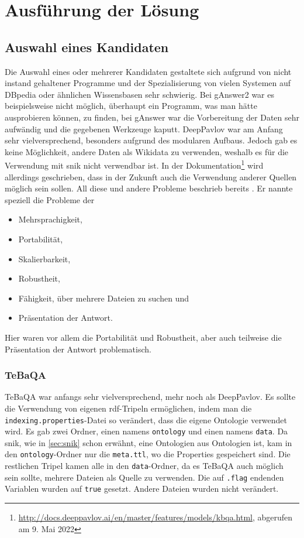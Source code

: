 \chapter{Ausführung der Lösung}\label{ch:solution}

\section{Auswahl eines Kandidaten}

Die Auswahl eines oder mehrerer Kandidaten gestaltete sich aufgrund von nicht instand gehaltener Programme
und der Spezialisierung von vielen Systemen auf DBpedia oder ähnlichen Wissensbasen sehr schwierig.
Bei gAnswer2 war es beispielsweise nicht möglich, überhaupt ein Programm, was man hätte ausprobieren können, zu finden,
bei gAnswer war die Vorbereitung der Daten sehr aufwändig und die gegebenen Werkzeuge kaputt.
DeepPavlov war am Anfang sehr vielversprechend, besonders aufgrund des modularen Aufbaus.
Jedoch gab es keine Möglichkeit, andere Daten als Wikidata zu verwenden, weshalb es für die Verwendung mit \ac{snik} nicht verwendbar ist.
In der Dokumentation\footnote{\url{http://docs.deeppavlov.ai/en/master/features/models/kbqa.html}, abgerufen am 9. Mai 2022} wird allerdings geschrieben,
dass in der Zukunft auch die Verwendung anderer Quellen möglich sein sollen.
All diese und andere Probleme beschrieb bereits \citet{diefenbachkbqa}.
Er nannte speziell die Probleme der
\begin{itemize}
  \item Mehrsprachigkeit,
  \item Portabilität,
  \item Skalierbarkeit,
  \item Robustheit,
  \item Fähigkeit, über mehrere Dateien zu suchen und
  \item Präsentation der Antwort.
\end{itemize}
Hier waren vor allem die Portabilität und Robustheit, aber auch teilweise die Präsentation der Antwort problematisch.

\subsection{TeBaQA}

TeBaQA war anfangs sehr vielversprechend, mehr noch als DeepPavlov.
Es sollte die Verwendung von eigenen \ac{rdf}-Tripeln ermöglichen, indem man die \texttt{indexing.properties}-Datei so verändert, dass die eigene Ontologie verwendet wird.
Es gab zwei Ordner, einen namens \texttt{ontology} und einen namens \texttt{data}.
Da \ac{snik}, wie in \cref{sec:snik} schon erwähnt, eine Ontologien aus Ontologien ist, kam in den \texttt{ontology}-Ordner nur die \texttt{meta.ttl}, wo die Properties gespeichert sind.
Die restlichen Tripel kamen alle in den \texttt{data}-Ordner, da es TeBaQA auch möglich sein sollte, mehrere Dateien als Quelle zu verwenden.
Die auf \texttt{.flag} endenden Variablen wurden auf \texttt{true} gesetzt.
Andere Dateien wurden nicht verändert.

